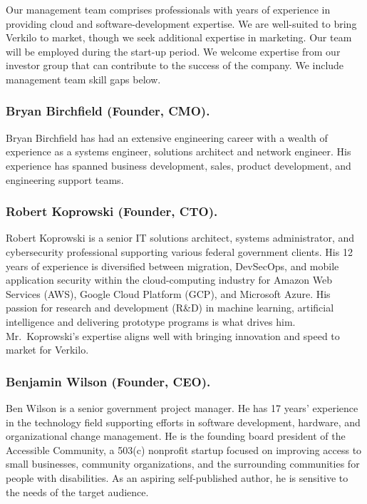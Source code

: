 \documentclass[11pt,openany]{book}
\begin{document}
Our management team comprises professionals with years of experience in
providing cloud and software-development expertise. We are well-suited
to bring Verkilo to market, though we seek additional expertise in
marketing. Our team will be employed during the start-up period. We
welcome expertise from our investor group that can contribute to the
success of the company. We include management team skill gaps below.

\hypertarget{bryan-birchfield-founder-cmo.}{%
\subsubsection{Bryan Birchfield (Founder,
CMO).}\label{bryan-birchfield-founder-cmo.}}

Bryan Birchfield has had an extensive engineering career with a wealth
of experience as a systems engineer, solutions architect and network
engineer. His experience has spanned business development, sales,
product development, and engineering support teams.

\hypertarget{robert-koprowski-founder-cto.}{%
\subsubsection{Robert Koprowski (Founder,
CTO).}\label{robert-koprowski-founder-cto.}}

Robert Koprowski is a senior IT solutions architect, systems
administrator, and cybersecurity professional supporting various federal
government clients. His 12 years of experience is diversified between
migration, DevSecOps, and mobile application security within the
cloud-computing industry for Amazon Web Services (AWS), Google Cloud
Platform (GCP), and Microsoft Azure. His passion for research and
development (R\&D) in machine learning, artificial intelligence and
delivering prototype programs is what drives him. Mr.~Koprowski's
expertise aligns well with bringing innovation and speed to market for
Verkilo.

\hypertarget{benjamin-wilson-founder-ceo.}{%
\subsubsection{Benjamin Wilson (Founder,
CEO).}\label{benjamin-wilson-founder-ceo.}}

Ben Wilson is a senior government project manager. He has 17 years'
experience in the technology field supporting efforts in software
development, hardware, and organizational change management. He is the
founding board president of the Accessible Community, a 503(c) nonprofit
startup focused on improving access to small businesses, community
organizations, and the surrounding communities for people with
disabilities. As an aspiring self-published author, he is sensitive to
the needs of the target audience.
\end{document}
